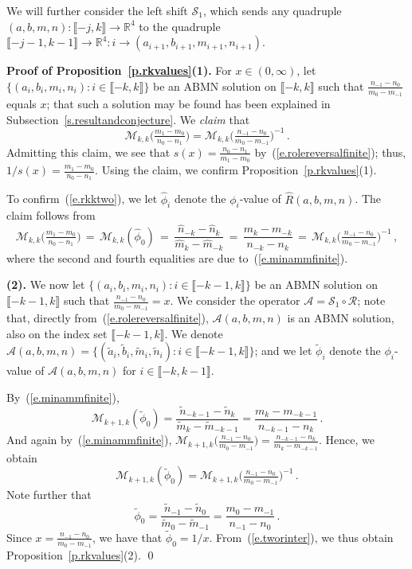 \documentclass[letterpaper,11pt,oneside,reqno]{amsbook}
\newcommand{\R}{\ensuremath{\mathbb{R}}}
\numberwithin{figure}{chapter}
\theoremstyle{definition}
\theoremstyle{definition}
\theoremstyle{definition}
\theoremstyle{definition}
\theoremstyle{definition}
\newcommand{\mc}{\mathcal}
\newcommand{\minamm}{\mathcal{M}}
\newcommand{\abmnmacspace}{\textrm{ABMN} }
\begin{document}
 We will further consider the left shift $\mc{S}_1$, which sends any quadruple 
 $(a,b,m,n): \llbracket -j,k \rrbracket \to \R^4$ to the quadruple  $\llbracket -j-1,k-1 \rrbracket \to \R^4: i \to (a_{i+1},b_{i+1},m_{i+1},n_{i+1})$.
 
 {\bf Proof of Proposition~\ref{p.rkvalues}(1).} For $x \in (0,\infty)$, let  $\big\{ (a_i,b_i,m_i,n_i): i \in \llbracket -k,k\rrbracket \big\}$ be an \abmnmacspace solution on $\llbracket -k,k \rrbracket$
 such that   $\tfrac{n_{-1} - n_0}{m_0 - m_{-1}}$ equals $x$; that such a solution may be found has been explained in Subsection~\ref{s.resultandconjecture}.
 We {\em claim} that
 \begin{equation}\label{e.rkktwo}
  \minamm_{k,k} \big( \tfrac{m_1 - m_0}{n_0 - n_1} \big) = \minamm_{k,k} \big( \tfrac{n_{-1} - n_0}{m_0 - m_{-1}} \big)^{-1} \, . 
 \end{equation}
 Admitting this claim, we see that $s(x)=  \tfrac{n_0 - n_1}{m_1 - m_0}$ by~(\ref{e.rolereversalfinite}); thus, 
 $1/s(x) =   \tfrac{m_1 - m_0}{n_0 - n_1}$. Using the claim, we confirm Proposition~\ref{p.rkvalues}(1). 
 
To confirm~(\ref{e.rkktwo}), we let $\hat\phi_i$ denote the $\phi_i$-value of $\hat{R}(a,b,m,n)$. The claim follows from
$$
  \minamm_{k,k} \big( \tfrac{m_1 - m_0}{n_0 - n_1} \big)  \, = \, \minamm_{k,k} (\hat\phi_0) \, = \, \frac{\hat{n}_{-k} - \hat{n}_k}{\hat{m}_k - \hat{m}_{-k}} \, = \, \frac{m_k - m_{-k}}{n_{-k} - n_k} 
    \, = \, \minamm_{k,k} \big(  \tfrac{n_{-1} - n_0}{m_0 - m_{-1}} \big)^{-1} \, ,
   $$
   where the second and fourth equalities are due to~(\ref{e.minammfinite}).
 
 
 {\bf (2).} We now let  $\big\{ (a_i,b_i,m_i,n_i): 
 i \in \llbracket -k-1,k\rrbracket \big\}$ 
 be an \abmnmacspace solution on $\llbracket -k-1,k \rrbracket$ such that $\tfrac{n_{-1} - n_0}{m_0 - m_{-1}}= x$.
 We consider the operator $\mc{A} = \mc{S}_1 \circ \mc{R}$; note that, directly from~(\ref{e.rolereversalfinite}), $\mc{A}(a,b,m,n)$ is an \abmnmacspace solution, also on the index set $\llbracket -k-1,k\rrbracket$.
 We denote $\mc{A}(a,b,m,n) = \big\{ (\tilde{a}_i,\tilde{b}_i,\tilde{m}_i,\tilde{n}_i): i \in \llbracket -k-1,k\rrbracket \big\}$; and we let $\tilde\phi_i$ denote the $\phi_i$-value of  $\mc{A}(a,b,m,n)$ for $i \in \llbracket -k,k-1 \rrbracket$.
 
 By~(\ref{e.minammfinite}),
 $$
 \minamm_{k+1,k}(\tilde\phi_0) = \frac{\tilde{n}_{-k-1} - \tilde{n}_k}{\tilde{m}_k - \tilde{m}_{-k-1}} = \frac{m_k - m_{-k-1}}{ n_{-k-1} - n_k} \, .
 $$
 And again by~(\ref{e.minammfinite}), $\minamm_{k+1,k}\big( \tfrac{n_{-1} - n_0}{m_0 - m_{-1}} \big) = \tfrac{n_{-k-1} - n_k}{m_k - m_{-k-1}}$. Hence, we obtain
 \begin{equation}\label{e.tworinter}
 \minamm_{k+1,k}(\tilde\phi_0) = \minamm_{k+1,k}\big( \tfrac{n_{-1} - n_0}{m_0 - m_{-1}} \big)^{-1} \, .
 \end{equation}
 Note further that
 $$
 \tilde\phi_0 = \frac{\tilde{n}_{-1} - \tilde{n}_0}{\tilde{m}_0  - \tilde{m}_{-1}} = \frac{m_0 - m_{-1}}{n_{-1} - n_0} \, .
 $$
Since $x = \tfrac{n_{-1} - n_0}{m_0 - m_{-1}}$, we have that $\tilde\phi_0 = 1/x$. 
From~(\ref{e.tworinter}), we thus obtain Proposition~\ref{p.rkvalues}(2). \qed
 
\end{document}
